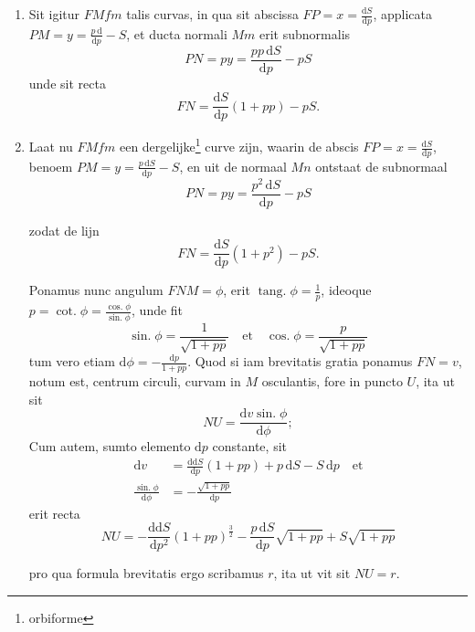 \documentclass[10pt,a4paper]{article}
\newcommand{\switchenum}{\setcounter{enumi}{\arabic{enumi}-1}\switchcolumn}
\DeclareMathOperator{\tang}{tang.}
\DeclareMathOperator{\cotg}{cot.}
\DeclareMathOperator{\sing}{sin.}
\DeclareMathOperator{\cosg}{cos.}
\def\D{\mathrm{d}}
\begin{document}
\begin{paracol}{2}
\begin{enumerate}[topsep=1px]
		\switchcolumn*
		
		\item Sit igitur $FMfm$ talis curvas, in qua sit abscissa $FP=x=\frac{\D S}{\D p}$, applicata $PM=y=\frac{p\,\D }{\D p}-S$, et ducta normali $Mm$ erit subnormalis
		\[
			PN = py = \frac{pp\,\D S}{\D p}-pS
		\]
		unde sit recta
		\[
			FN = \frac{\D S}{\D p}(1+pp)-pS.
		\]
				
		\switchenum
		\item Laat nu $FMfm$ een dergelijke\footnote{orbiforme} curve zijn, waarin de abscis $FP=x=\frac{\D S}{\D p}$, benoem $PM=y=\frac{p\, \D S}{\D p}-S$, en uit de normaal $Mn$ ontstaat de subnormaal
		\[
			PN = py = \frac{p^2\,\D S}{\D p}-pS
		\]
		\par zodat de lijn
		\[
			FN = \frac{\D S}{\D p}(1+p^2)-pS.
		\]
		\newpage
		
		\switchcolumn*
		\par Ponamus nunc angulum $FNM = \phi$, erit $\tang \phi = \frac{1}{p}$, ideoque $p=\cotg \phi = \frac{\cosg \phi}{\sing \phi}$, unde fit
		\[
		\sing \phi = \frac{1}{\sqrt{1+pp}} \quad \text{et} \quad \cosg \phi = \frac{p}{\sqrt{1+pp}}
		\]
		tum vero etiam $\D \phi = -\frac{\D p}{1+pp}$. Quod si iam brevitatis gratia ponamus $FN=v$, notum est, centrum circuli, curvam in $M$ osculantis, fore in puncto $U$, ita ut sit
		\[
		NU = \frac{\D v\sing \phi}{\D \phi};
		\]
		Cum autem, sumto elemento $\D p$ constante, sit
		\begin{align*}
		\D  v &= \frac{\D \D  S}{\D p}(1+pp)+p\,\D S-S\,\D p \quad \text{et}\\
		\frac{\sing \phi}{\D \phi} &= -\frac{\sqrt{1+pp}}{\D p}
		\end{align*}
		erit recta
		\[
		NU = -\frac{\D\D S}{\D p^2} (1+pp)^{\frac{3}{2}}-\frac{p\,\D S}{\D p} \sqrt{1+pp} + S\sqrt{1+pp}
		\]
		\par pro qua formula brevitatis ergo scribamus $r$, ita ut vit sit $NU=r$.
		\switchcolumn
		

\end{enumerate}
\end{paracol}
\end{document}
